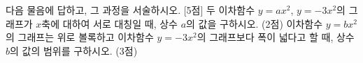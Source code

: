 다음 물음에 답하고, 그 과정을 서술하시오. \mbox{[5점]}
 두 이차함수 $y=ax^2$, $y=-3x^2$의 그래프가 $x$축에 대하여 서로 대칭일 때, 상수 $a$의 값을 구하시오. (2점)
 이차함수 $y=bx^2$의 그래프는 위로 볼록하고 이차함수 $y=-3x^2$의 그래프보다 폭이 넓다고 할 때, 상수 $b$의 값의 범위를 구하시오. (3점)
